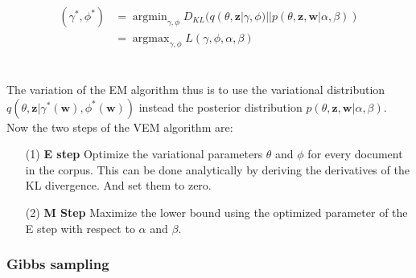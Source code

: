 \documentclass[11pt,a4paper]{article}
\DeclareMathOperator*{\argmin}{argmin}
\DeclareMathOperator*{\argmax}{argmax}
\begin{document}
\begin{align}
(\gamma^*, \phi^*) &= \argmin_{\gamma, \phi}D_{KL}(q(\theta,\textbf{z}|\gamma,\phi)||p(\theta,\textbf{z},\textbf{w}|\alpha,\beta))\\
&= \argmax_{\gamma, \phi} L(\gamma,\phi,\alpha, \beta)
\end{align}\\
\\
The variation of the EM algorithm thus is to use the variational distribution $q(\theta,\textbf{z}|\gamma^*(\textbf{w}), \phi^*(\textbf{w}))$ instead the posterior distribution $p(\theta,\textbf{z},\textbf{w}|\alpha,\beta)$. Now the two steps of the VEM algorithm are:
\begin{itemize}
	\item [(1)]\textbf{E step} Optimize the variational parameters $\theta$ and $\phi$ for every document in the corpus. This can be done analytically by deriving the derivatives of the KL divergence. And set them to zero.
	\item [(2)] \textbf{M Step} Maximize the lower bound using the optimized parameter of the E step with respect to $\alpha$ and $\beta$.
\end{itemize}


\subsubsection{Gibbs sampling}
\end{document}
